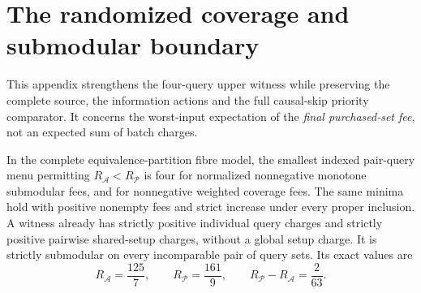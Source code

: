 \section{The randomized coverage and submodular boundary}
\label{app:coverage-boundary}
This appendix strengthens the four-query upper witness while preserving
the complete source, the information actions and the full causal-skip
priority comparator. It concerns the worst-input expectation of the
\emph{final purchased-set fee}, not an expected sum of batch charges.

\begin{theorem}
\label{thm:coverage-four}
In the complete equivalence-partition fibre model, the smallest indexed
pair-query menu permitting $R_{\mathcal A}<R_{\mathcal P}$ is four for
normalized nonnegative monotone submodular fees, and for nonnegative
weighted coverage fees. The same minima hold with positive nonempty fees
and strict increase under every proper inclusion. A witness already has
strictly positive individual query charges and strictly positive pairwise
shared-setup charges, without a global setup charge. It is strictly
submodular on every incomparable pair of query sets. Its exact values are
\[
 R_{\mathcal A}=\frac{125}{7},\qquad
 R_{\mathcal P}=\frac{161}{9},\qquad
 R_{\mathcal P}-R_{\mathcal A}=\frac{2}{63}.
\]
\end{theorem}
